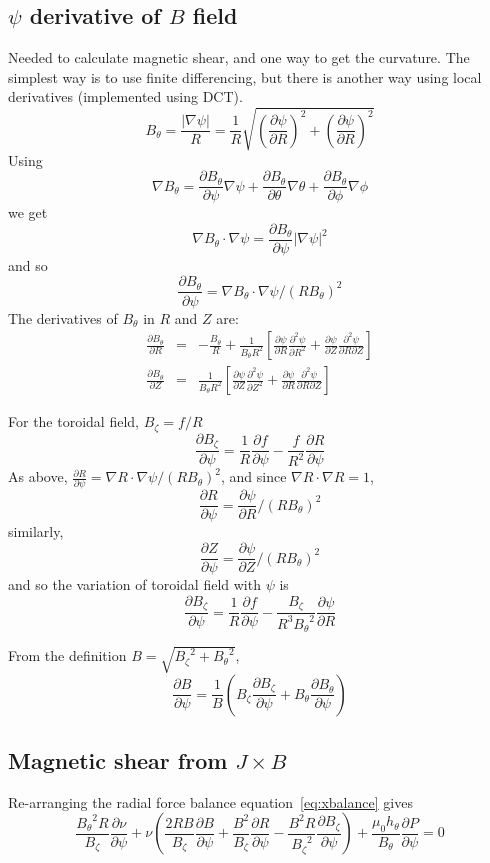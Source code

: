 \documentclass[12pt, a4paper]{article}
\newcommand{\deriv}[2]{\ensuremath{\frac{\partial #1}{\partial #2}}}
\newcommand{\dderiv}[2]{\ensuremath{\frac{\partial^2 #1}{\partial {#2}^2}}}
\newcommand{\hthe}{\ensuremath{h_\theta}}
\newcommand{\Bp}{\ensuremath{B_\theta}}
\newcommand{\Bt}{\ensuremath{B_\zeta}}
\begin{document}
\subsection{$\psi$ derivative of $B$ field}

Needed to calculate magnetic shear, and one way to get the curvature.
The simplest way is to use finite differencing, but there is another way
using local derivatives (implemented using DCT).
\[
\Bp = \frac{\left|\nabla\psi\right|}{R} = \frac{1}{R}\sqrt{\left(\deriv{\psi}{R}\right)^2 + \left(\deriv{\psi}{R}\right)^2}
\]
Using
\[
\nabla\Bp = \deriv{\Bp}{\psi}\nabla\psi + \deriv{\Bp}{\theta}\nabla\theta + \deriv{\Bp}{\phi}\nabla\phi
\]
we get
\[
\nabla\Bp \cdot\nabla\psi = \deriv{\Bp}{\psi}\left|\nabla\psi\right|^2
\]
and so
\[
\deriv{\Bp}{\psi} = \nabla\Bp \cdot\nabla\psi / \left(R\Bp\right)^2
\]
The derivatives of $\Bp$ in $R$ and $Z$ are:
\begin{eqnarray*}
\deriv{\Bp}{R} &=& -\frac{\Bp}{R} + \frac{1}{\Bp R^2}\left[\deriv{\psi}{R}\dderiv{\psi}{R} + \deriv{\psi}{Z}\frac{\partial^2\psi}{\partial R\partial Z}\right] \\
\deriv{\Bp}{Z} &=& \frac{1}{\Bp R^2}\left[\deriv{\psi}{Z}\dderiv{\psi}{Z} + \deriv{\psi}{R}\frac{\partial^2\psi}{\partial R\partial Z}\right]
\end{eqnarray*}

For the toroidal field, $\Bt = f/R$
\[
\deriv{\Bt}{\psi} = \frac{1}{R}\deriv{f}{\psi} - \frac{f}{R^2}\deriv{R}{\psi}
\]
As above, $\deriv{R}{\psi} = \nabla R \cdot\nabla\psi / \left(R\Bp\right)^2$,
and since $\nabla R\cdot\nabla R = 1$,
\[
\deriv{R}{\psi} = \deriv{\psi}{R} / \left(R\Bp\right)^2
\]
similarly,
\[
\deriv{Z}{\psi} = \deriv{\psi}{Z} / \left(R\Bp\right)^2
\]
and so the variation of toroidal field with $\psi$ is
\[
\deriv{\Bt}{\psi} = \frac{1}{R}\deriv{f}{\psi} - \frac{\Bt}{R^3\Bp^2}\deriv{\psi}{R}
\]

From the definition $B=\sqrt{\Bt^2 + \Bp^2}$, 
\[
\deriv{B}{\psi} = \frac{1}{B}\left(\Bt\deriv{\Bt}{\psi} + \Bp\deriv{\Bp}{\psi}\right)
\]

\subsection{Magnetic shear from $J\times B$}

Re-arranging the radial force balance equation~\ref{eq:xbalance} gives
\[
\frac{\Bp^2R}{\Bt}\deriv{\nu}{\psi} + \nu\left(\frac{2RB}{\Bt}\deriv{B}{\psi} + \frac{B^2}{\Bt}\deriv{R}{\psi} - \frac{B^2R}{\Bt^2}\deriv{\Bt}{\psi}\right) + \frac{\mu_0\hthe}{\Bp}\deriv{P}{\psi} = 0
\]
\end{document}

